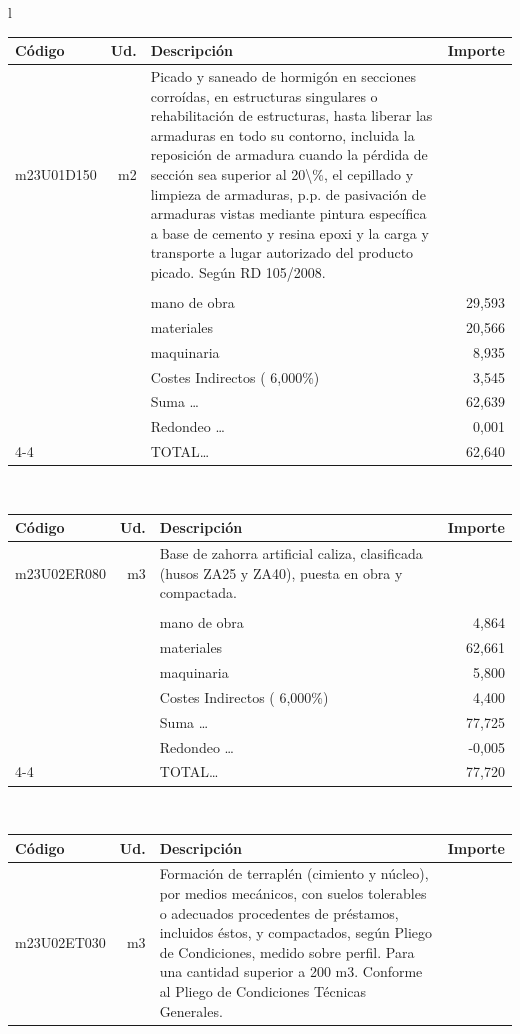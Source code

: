 \documentclass{book}%
\begin{document}
\begin{longtable}{l}
\begin{tabular}{l r p{60mm} r}%
Código&Ud.&Descripción&Importe\\%
\hline%
m23U01D150&m2&Picado y saneado de hormigón en secciones corroídas, en estructuras singulares o rehabilitación de estructuras, hasta liberar las armaduras en todo su contorno, incluida la reposición de armadura cuando la pérdida de sección sea superior al 20\textbackslash{}\%, el cepillado y limpieza de armaduras, p.p. de pasivación de armaduras vistas mediante pintura específica a base de cemento y resina epoxi y la carga y transporte a lugar autorizado del producto picado. Según RD 105/2008.&\\%
&&&\\%
&&mano de obra&    29,593\\%
&&materiales&    20,566\\%
&&maquinaria&     8,935\\%
&&Costes Indirectos (     6,000\%)&     3,545\\%
&&Suma \ldots&    62,639\\%
&&Redondeo \ldots&     0,001\\%
\cline{4-4}%
&&TOTAL\ldots&    62,640\\%
\end{tabular}\\%
\begin{tabular}{l r p{60mm} r}%
Código&Ud.&Descripción&Importe\\%
\hline%
m23U02ER080&m3&Base de zahorra artificial caliza, clasificada (husos ZA25 y ZA40), puesta en obra y compactada.&\\%
&&&\\%
&&mano de obra&     4,864\\%
&&materiales&    62,661\\%
&&maquinaria&     5,800\\%
&&Costes Indirectos (     6,000\%)&     4,400\\%
&&Suma \ldots&    77,725\\%
&&Redondeo \ldots&    {-}0,005\\%
\cline{4-4}%
&&TOTAL\ldots&    77,720\\%
\end{tabular}\\%
\begin{tabular}{l r p{60mm} r}%
Código&Ud.&Descripción&Importe\\%
\hline%
m23U02ET030&m3&Formación de terraplén (cimiento y núcleo), por medios mecánicos, con suelos tolerables o adecuados procedentes de préstamos, incluidos éstos, y compactados, según Pliego de Condiciones, medido sobre perfil. Para una cantidad superior a 200 m3. Conforme al Pliego de Condiciones Técnicas Generales.&\\%

\end{tabular}
\end{longtable}
\end{document}
